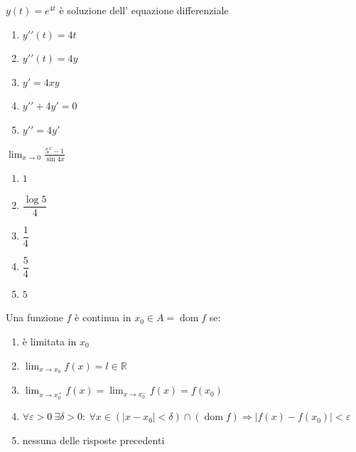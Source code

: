 \begin{quiz}
$y(t)=e^{4t}$ \`e soluzione dell' equazione differenziale
\begin{enumerate}
\item $y\prime\prime(t)=4t$
\item $y\prime\prime(t)=4y$
\item $y\prime=4xy$
\item $y\prime\prime+4y\prime=0$
\item $y\prime\prime=4y\prime$
\end{enumerate}
\end{quiz}

\begin{quiz}
$\displaystyle\lim_{x\to0}\frac{5^x-1}{\sin4x}$
\begin{enumerate}
\item $1$
\item $\dfrac{\log5}{4}$
\item $\dfrac14$
\item $\dfrac54$
\item $5$
\end{enumerate}
\end{quiz}

\begin{quiz}
Una funzione $f$ \`e continua in $x_0\in A=\operatorname{dom}f$ se:
\begin{enumerate}
\item \`e limitata in $x_0$
\item $\lim_{x\to x_0}f(x)=l\in\mathbb R$
\item $\lim_{x\to x_0^+}f(x)=\lim_{x\to x_0^-}f(x)=f(x_0)$
\item $\forall\varepsilon>0\ \exists\delta>0:\ \forall x\in (|x-x_0|<\delta)\cap(\operatorname{dom}f)\Rightarrow |f(x)-f(x_0)|<\varepsilon$
\item nessuna delle risposte precedenti
\end{enumerate}
\end{quiz}

